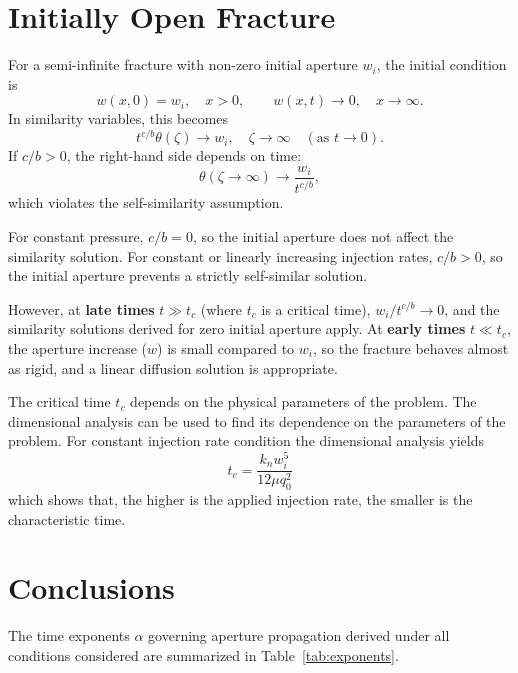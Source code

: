 \documentclass[12pt]{article}
\begin{document}
\section{Initially Open Fracture}

For a semi-infinite fracture with non-zero initial aperture $w_i$, the initial condition is
\begin{equation*}
	w(x,0) = w_i, \quad x>0, \qquad w(x,t) \to 0, \quad x \to \infty.
\end{equation*}
In similarity variables, this becomes
\begin{equation*}
	t^{c / b} \theta(\zeta) \to w_i, \quad \zeta \to \infty \quad (\text{as } t \to 0).
\end{equation*}
If $c / b > 0$, the right-hand side depends on time:
\begin{equation*}
	\theta(\zeta \to \infty) \to \frac{w_i}{t^{c / b}},
\end{equation*}
which violates the self-similarity assumption.

For constant pressure, $c/b = 0$, so the initial aperture does not affect the similarity solution. For constant or linearly increasing injection rates, $c/b > 0$, so the initial aperture prevents a strictly self-similar solution.

However, at \textbf{late times} $t \gg t_c$ (where $t_c$ is a critical time), $w_i / t^{c/b} \to 0$, and the similarity solutions derived for zero initial aperture apply. At \textbf{early times} $t \ll t_c$, the aperture increase ($w$) is small compared to $w_i$, so the fracture behaves almost as rigid, and a linear diffusion solution is appropriate.

The critical time $t_c$ depends on the physical parameters of the problem. The dimensional analysis can be used to find its dependence on the parameters of the problem. For constant injection rate condition the dimensional analysis yields
\begin{equation*}
	t_c = \frac{k_n w_i^5}{12 \mu q_0^2}
\end{equation*}
which shows that, the higher is the applied injection rate, the smaller is the characteristic time.

\section{Conclusions}

The time exponents $\alpha$ governing aperture propagation derived under all conditions considered are summarized in Table~\ref{tab:exponents}.
\end{document}
